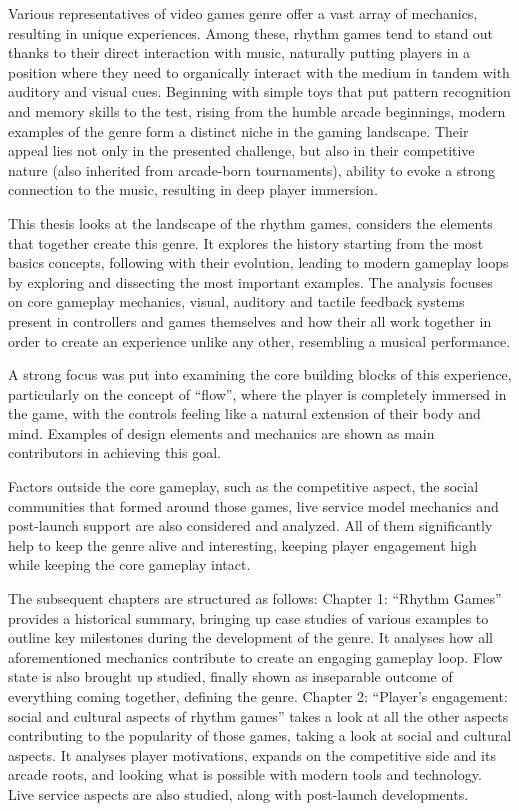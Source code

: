 Various representatives of video games genre offer a vast array of mechanics, resulting in unique experiences. Among these, rhythm games tend to stand out thanks to their direct interaction with music, naturally putting players in a position where they need to organically interact with the medium in tandem with auditory and visual cues. Beginning with simple toys that put pattern recognition and memory skills to the test, rising from the humble arcade beginnings, modern examples of the genre form a distinct niche in the gaming landscape. Their appeal lies not only in the presented challenge, but also in their competitive nature (also inherited from arcade-born tournaments), ability to evoke a strong connection to the music, resulting in deep player immersion.

This thesis looks at the landscape of the rhythm games, considers the elements that together create this genre. It explores the history starting from the most basics concepts, following with their evolution, leading to modern gameplay loops by exploring and dissecting the most important examples. The analysis focuses on core gameplay mechanics, visual, auditory and tactile feedback systems present in controllers and games themselves and how their all work together in order to create an experience unlike any other, resembling a musical performance.

A strong focus was put into examining the core building blocks of this experience, particularly on the concept of ``flow'', where the player is completely immersed in the game, with the controls feeling like a natural extension of their body and mind. Examples of design elements and mechanics are shown as main contributors in achieving this goal. 

Factors outside the core gameplay, such as the competitive aspect, the social communities that formed around those games, live service model mechanics and post-launch support are also considered and analyzed. All of them significantly help to keep the genre alive and interesting, keeping player engagement high while keeping the core gameplay intact.

The subsequent chapters are structured as follows: Chapter 1: ``Rhythm Games'' provides a historical summary, bringing up case studies of various examples to outline key milestones during the development of the genre. It analyses how all aforementioned mechanics contribute to create an engaging gameplay loop. Flow state is also brought up studied, finally shown as inseparable outcome of everything coming together, defining the genre. Chapter 2: ``Player’s engagement: social and cultural aspects of rhythm games'' takes a look at all the other aspects contributing to the popularity of those games, taking a look at social and cultural aspects. It analyses player motivations, expands on the competitive side and its arcade roots, and looking what is possible with modern tools and technology. Live service aspects are also studied, along with post-launch developments.

